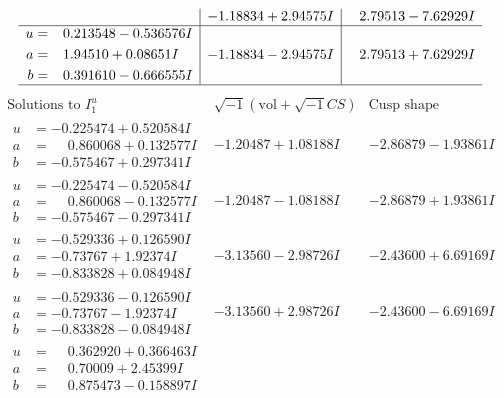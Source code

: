 \documentclass[1p]{elsarticle_modified}
\theoremstyle{definition}
\newcommand{\I}{\sqrt{-1}}
\begin{document}
$$\begin{array}{c|c|c}
 & -1.18834 + 2.94575 I & \phantom{-}2.79513 - 7.62929 I \\ \hline\begin{aligned}
u &= \phantom{-}0.213548 - 0.536576 I \\
a &= \phantom{-}1.94510 + 0.08651 I \\
b &= \phantom{-}0.391610 - 0.666555 I\end{aligned}
 & -1.18834 - 2.94575 I & \phantom{-}2.79513 + 7.62929 I\\
 \hline 
 \end{array}$$\newpage$$\begin{array}{c|c|c}  
\text{Solutions to }I^u_{1}& \I (\text{vol} + \sqrt{-1}CS) & \text{Cusp shape}\\
 \hline 
\begin{aligned}
u &= -0.225474 + 0.520584 I \\
a &= \phantom{-}0.860068 + 0.132577 I \\
b &= -0.575467 + 0.297341 I\end{aligned}
 & -1.20487 + 1.08188 I & -2.86879 - 1.93861 I \\ \hline\begin{aligned}
u &= -0.225474 - 0.520584 I \\
a &= \phantom{-}0.860068 - 0.132577 I \\
b &= -0.575467 - 0.297341 I\end{aligned}
 & -1.20487 - 1.08188 I & -2.86879 + 1.93861 I \\ \hline\begin{aligned}
u &= -0.529336 + 0.126590 I \\
a &= -0.73767 + 1.92374 I \\
b &= -0.833828 + 0.084948 I\end{aligned}
 & -3.13560 - 2.98726 I & -2.43600 + 6.69169 I \\ \hline\begin{aligned}
u &= -0.529336 - 0.126590 I \\
a &= -0.73767 - 1.92374 I \\
b &= -0.833828 - 0.084948 I\end{aligned}
 & -3.13560 + 2.98726 I & -2.43600 - 6.69169 I \\ \hline\begin{aligned}
u &= \phantom{-}0.362920 + 0.366463 I \\
a &= \phantom{-}0.70009 + 2.45399 I \\
b &= \phantom{-}0.875473 - 0.158897 I\end{aligned}

\end{array}$$
\end{document}

